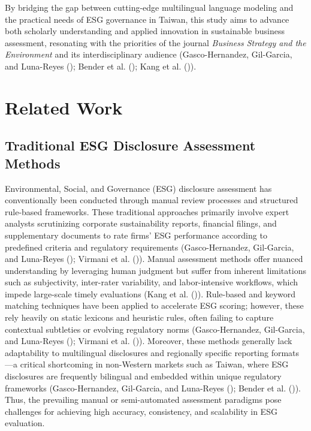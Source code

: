 \documentclass[
  12pt,
]{article}
\begin{document}
By bridging the gap between cutting-edge multilingual language modeling
and the practical needs of ESG governance in Taiwan, this study aims to
advance both scholarly understanding and applied innovation in
sustainable business assessment, resonating with the priorities of the
journal \emph{Business Strategy and the Environment} and its
interdisciplinary audience (Gasco-Hernandez, Gil-Garcia, and Luna-Reyes
(); Bender et al.
(); Kang et al.
()).

\section{Related Work}\label{related-work}

\subsection{Traditional ESG Disclosure Assessment
Methods}\label{traditional-esg-disclosure-assessment-methods}

Environmental, Social, and Governance (ESG) disclosure assessment has
conventionally been conducted through manual review processes and
structured rule-based frameworks. These traditional approaches primarily
involve expert analysts scrutinizing corporate sustainability reports,
financial filings, and supplementary documents to rate firms' ESG
performance according to predefined criteria and regulatory requirements
(Gasco-Hernandez, Gil-Garcia, and Luna-Reyes
(); Virmani et al.
()). Manual assessment methods offer
nuanced understanding by leveraging human judgment but suffer from
inherent limitations such as subjectivity, inter-rater variability, and
labor-intensive workflows, which impede large-scale timely evaluations
(Kang et al. ()). Rule-based and keyword
matching techniques have been applied to accelerate ESG scoring;
however, these rely heavily on static lexicons and heuristic rules,
often failing to capture contextual subtleties or evolving regulatory
norms (Gasco-Hernandez, Gil-Garcia, and Luna-Reyes
(); Virmani et al.
()). Moreover, these methods generally
lack adaptability to multilingual disclosures and regionally specific
reporting formats---a critical shortcoming in non-Western markets such
as Taiwan, where ESG disclosures are frequently bilingual and embedded
within unique regulatory frameworks (Gasco-Hernandez, Gil-Garcia, and
Luna-Reyes (); Bender et al.
()). Thus, the prevailing manual or
semi-automated assessment paradigms pose challenges for achieving high
accuracy, consistency, and scalability in ESG evaluation.
\end{document}
